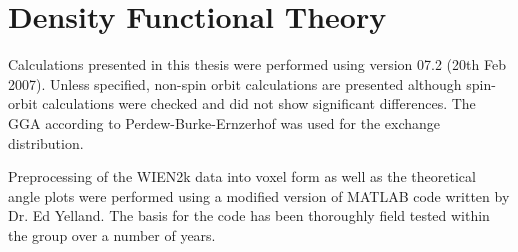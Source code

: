 
\section{Density Functional Theory}
\label{Sec:Exp:Dft}

Calculations presented in this thesis were performed using \WIEN version 07.2 (20th Feb 2007). Unless specified, non-spin orbit calculations are presented although spin-orbit calculations were checked and did not show significant differences. The \ac{GGA} according to Perdew-Burke-Ernzerhof was used for the exchange distribution.

Preprocessing of the WIEN2k data into voxel form as well as the theoretical angle plots were performed using a modified version of MATLAB code written by Dr. Ed Yelland. The basis for the code has been thoroughly field tested within the group over a number of years.
